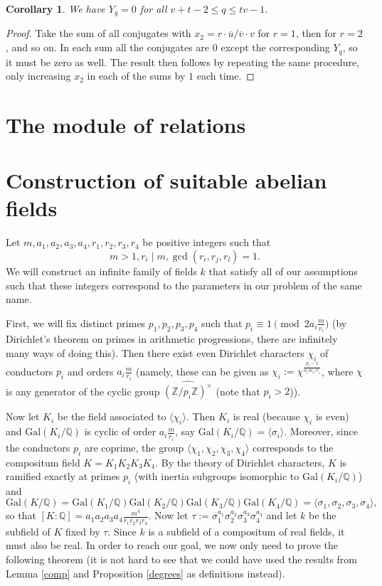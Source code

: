 \documentclass[12pt,a4paper]{article}
\newtheorem{cor}[theorem]{Corollary}
\newcommand{\Q}{\mathbb{Q}}
\newcommand{\Z}{\mathbb{Z}}
\newcommand{\Gal}{\mathrm{Gal}}
\newcommand{\uo}{\overline{u}}
\newcommand{\vo}{\overline{v}}
\begin{document}
\begin{cor}
We have $Y_q=0$ for all $v+t-2\leq q\leq tv-1$.
\end{cor}
\begin{proof}
Take the sum of all conjugates with $x_2=r\cdot\uo/\vo\cdot v$ for $r=1$, then for $r=2$, and so on. In each sum all the conjugates are $0$ except the corresponding $Y_q$, so it must be zero as well. The result then follows by repeating the same procedure, only increasing $x_2$ in each of the sums by $1$ each time.
\end{proof}
\section{The module of relations}
\section{Construction of suitable abelian fields}
Let $m,a_1,a_2,a_3,a_4,r_1,r_2,r_3,r_4$ be positive integers such that 
$$m>1, r_i\mid m, \gcd(r_i,r_j,r_l)=1.$$
We will construct an infinite family of fields $k$ that satisfy all of our assumptions such that these integers correspond to the parameters in our problem of the same name.

First, we will fix distinct primes $p_1,p_2,p_3,p_4$ such that $p_i\equiv 1\pmod{ 2a_i\frac{m}{r_i}}$ (by Dirichlet's theorem on primes in arithmetic progressions, there are infinitely many ways of doing this). Then there exist even Dirichlet characters $\chi_i$ of conductors $p_i$ and orders $a_i\frac{m}{r_i}$ (namely, these can be given as $\chi_i:=\chi^{\frac{p_i-1}{a_im_i/r_i}}$, where $\chi$ is any generator of the cyclic group $\widehat{(\Z/p_i\Z)^\times}$ (note that $p_i>2$)).

Now let $K_i$ be the field associated to $\langle \chi_i\rangle$. Then $K_i$ is real (because $\chi_i$ is even) and $\Gal(K_i/\Q)$ is cyclic of order $a_i\frac{m}{r_i}$, say $\Gal(K_i/\Q)=\langle \sigma_i\rangle$. Moreover, since the conductors $p_i$ are coprime, the group $\langle \chi_1,\chi_2,\chi_3,\chi_4\rangle$ corresponds to the compositum field $K=K_1K_2K_3K_4$. By the theory of Dirichlet characters, $K$ is ramified exactly at primes $p_i$ (with inertia subgroups isomorphic to $\Gal(K_i/\Q)$) and $$\Gal(K/\Q)=\Gal(K_1/\Q)\Gal(K_2/\Q)\Gal(K_3/\Q)\Gal(K_4/\Q)=\langle\sigma_1,\sigma_2,\sigma_3,\sigma_4\rangle,$$
so that $[K:\Q]=a_1a_2a_3a_4\frac{m^4}{r_1r_2r_3r_4}$. Now let $\tau:=\sigma_1^{a_1}\sigma_2^{a_2}\sigma_3^{a_3}\sigma_4^{a_4}$ and let $k$ be the subfield of $K$ fixed by $\tau$. Since $k$ is a subfield of a compositum of real fields, it must also be real. In order to reach our goal, we now only need to prove the following theorem (it is not hard to see that we could have used the results from Lemma \ref{comp} and Proposition \ref{degrees} as definitions instead).
\end{document}
